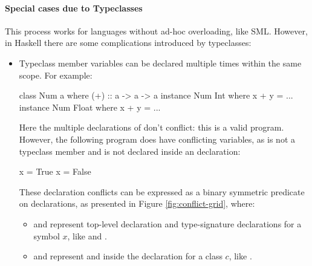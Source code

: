 \documentclass[dissertation.tex]{subfiles}
\begin{document}
{{        \paragraph*{Special cases due to Typeclasses}

        This process works for languages without ad-hoc overloading, like SML. However, in Haskell there are some
        complications introduced by typeclasses:

        \begin{itemize}
        \item
        {
            
            Typeclass member variables can be declared multiple times within the same scope. For example:
            
            \begin{haskellfigure}
            class Num a where
                (+) :: a -> a -> a
            instance Num Int where
                x + y = ...
            instance Num Float where
                x + y = ...
            \end{haskellfigure}

            Here the multiple declarations of \haskell{(+)} don't conflict: this is a valid program. However, the
            following program does have conflicting variables, as  is not a typeclass member and is not
            declared inside an  declaration:

            \begin{haskellfigure}
            x = True
            x = False
            \end{haskellfigure}

            These declaration conflicts can be expressed as a binary symmetric predicate on declarations, as presented
            in Figure \ref{fig:conflict-grid}, where:

            \begin{itemize}
            \item
            {

                 and  represent top-level declaration and type-signature
                declarations for a symbol \(x\), like  and .

            }
            \item
            {
                
                 and  represent  and  inside the declaration for a class \(c\), like .

}
\end{itemize}}
\end{itemize}}}
\end{document}
